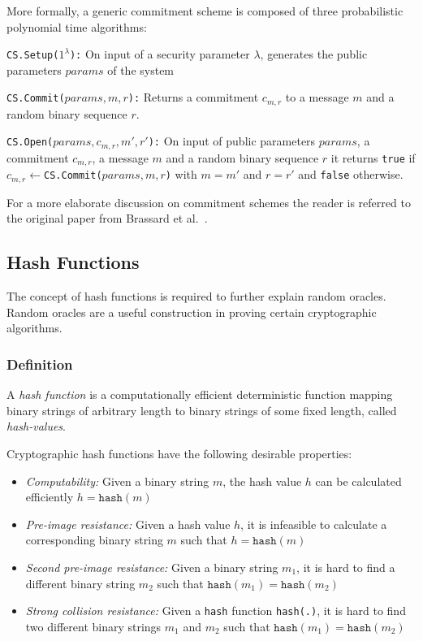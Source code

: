 More formally, a generic commitment scheme is composed of three probabilistic polynomial time algorithms:

\begin{description}
 \item \texttt{CS.Setup($1^{\lambda}$):} On input of a security parameter $\lambda$, generates the public parameters $params$ of the system
 \item \texttt{CS.Commit($params, m, r$):} Returns a commitment $c_{m,r}$ to a message $m$ and a random binary sequence $r$.
 \item \texttt{CS.Open($params, c_{m,r}, m', r'$):} On input of public parameters $params$, a commitment $c_{m,r}$, a message $m$ and a random binary sequence $r$ it returns \texttt{true} if $c_{m,r} \leftarrow $\texttt{CS.Commit($params, m, r$)} with $m = m'$ and $r = r'$ and \texttt{false} otherwise.
\end{description}

For a more elaborate discussion on commitment schemes the reader is referred to the original paper from Brassard et al.~\cite{art:BrassardCC88}.

\subsection{Hash Functions}
The concept of hash functions is required to further explain random oracles. Random oracles are a useful construction in proving certain cryptographic algorithms.

\label{sec:hash_functions}
\subsubsection{Definition}
A \textit{hash function} is a computationally efficient deterministic function mapping binary strings of arbitrary length to binary strings of some fixed length, called \textit{hash-values}.

Cryptographic hash functions have the following desirable properties:
\begin{itemize}
 \item \textit{Computability:} Given a binary string $m$, the hash value $h$ can be calculated efficiently $h = \texttt{hash} \left( m \right)$
 \item \textit{Pre-image resistance:} Given a hash value $h$, it is infeasible to calculate a corresponding binary string $m$ such that $h = \texttt{hash} \left( m \right)$
 \item \textit{Second pre-image resistance:} Given a binary string $m_1$, it is hard to find a different binary string $m_2$ such that $\texttt{hash} \left( m_1 \right) = \texttt{hash} \left( m_2 \right)$
 \item \textit{Strong collision resistance:} Given a \texttt{hash} function \texttt{hash(.)}, it is hard to find two different binary strings $m_1$ and $m_2$ such that $\texttt{hash} \left( m_1 \right) = \texttt{hash} \left( m_2 \right)$
\end{itemize}

